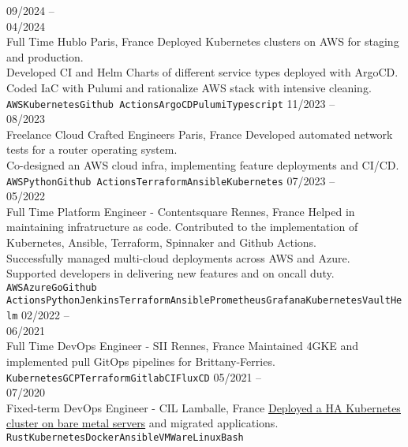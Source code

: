 \documentclass[10pt]{developercv}
\begin{document}
\begin{entrylist}
	\entry
		{09/2024 --\\04/2024\\\footnotesize{Full Time}}
		{Hublo}
		{Paris, France}
		{Deployed Kubernetes clusters on AWS for staging and production.\\
		Developed CI and Helm Charts of different service types deployed with ArgoCD.\\
		Coded IaC with Pulumi and rationalize AWS stack with intensive cleaning.\\
		\texttt{AWS}\slashsep\texttt{Kubernetes}\slashsep\texttt{Github Actions}\slashsep\texttt{ArgoCD}\slashsep\texttt{Pulumi}\slashsep\texttt{Typescript}}
	\entry
		{11/2023 --\\08/2023\\\footnotesize{Freelance}}
		{Cloud Crafted Engineers}
		{Paris, France}
		{Developed automated network tests for a router operating system.\\
		Co-designed an AWS cloud infra, implementing feature deployments and CI/CD.\\
		\texttt{AWS}\slashsep\texttt{Python}\slashsep\texttt{Github Actions}\slashsep\texttt{Terraform}\slashsep\texttt{Ansible}\slashsep\texttt{Kubernetes}}
	\entry
		{07/2023 --\\05/2022\\\footnotesize{Full Time}}
		{Platform Engineer - Contentsquare}
		{Rennes, France}
		{Helped in maintaining infratructure as code. Contributed to the implementation of Kubernetes, Ansible, Terraform, Spinnaker and Github Actions.\\
		Successfully managed multi-cloud deployments across AWS and Azure.\\
		Supported developers in delivering new features and on oncall duty.\\
		\texttt{AWS}\slashsep\texttt{Azure}\slashsep\texttt{Go}\slashsep\texttt{Github Actions}\slashsep\texttt{Python}\slashsep\texttt{Jenkins}\slashsep\texttt{Terraform}\slashsep\texttt{Ansible}\slashsep\texttt{Prometheus}\slashsep\texttt{Grafana}\slashsep\texttt{Kubernetes}\slashsep\texttt{Vault}\slashsep\texttt{Helm}}
	\entry
		{02/2022 --\\06/2021\\\footnotesize{Full Time}}
		{DevOps Engineer - SII}
		{Rennes, France}
		{Maintained 4GKE and implemented pull GitOps pipelines for Brittany-Ferries.\\
		\texttt{Kubernetes}\slashsep\texttt{GCP}\slashsep\texttt{Terraform}\slashsep\texttt{GitlabCI}\slashsep\texttt{FluxCD}}
	\entry
		{05/2021 --\\07/2020\\\footnotesize{Fixed-term}}
		{DevOps Engineer - CIL}
		{Lamballe, France}
		{\href{https://github.com/Ant0wan/VMWare-Kubenetes-cluster}{Deployed a HA Kubernetes cluster on bare metal servers} and migrated applications.\\
		\texttt{Rust}\slashsep\texttt{Kubernetes}\slashsep\texttt{Docker}\slashsep\texttt{Ansible}\slashsep\texttt{VMWare}\slashsep\texttt{Linux}\slashsep\texttt{Bash}}
\end{entrylist}
\end{document}
